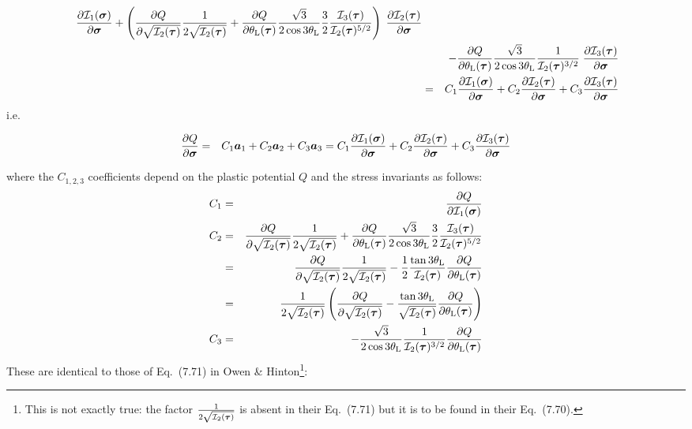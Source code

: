 \begin{eqnarray}
\; \frac{\partial {\cal I}_1(\bm\sigma)}{\partial \bm\sigma} 
+  
\left(\frac{\partial Q}{\partial \sqrt{{\cal I}_2(\bm\tau)}} 
\frac{1}{2 \sqrt{ {\cal I}_2(\bm\tau)}   }   
+
\frac{\partial Q}{\partial \theta_{\rm L}(\bm\tau)} 
\frac{\sqrt{3}}{2\cos 3\theta_{\rm L}}
\frac32  \frac{ {\cal I}_3(\bm\tau)   }{ {\cal I}_2(\bm\tau)^{5/2}}
\right)
\; \frac{\partial {\cal I}_2(\bm\tau)}{\partial \bm\sigma} \nonumber\\
&&
-
\frac{\partial Q}{\partial \theta_{\rm L}(\bm\tau)} 
\frac{\sqrt{3}}{2\cos 3\theta_{\rm L}}
\frac{1}{{\cal I}_2(\bm\tau)^{3/2}} 
\; \frac{\partial {\cal I}_3(\bm\tau)}{\partial \bm\sigma} \nonumber\\
&=& 
C_1  \frac{\partial {\cal I}_1(\bm\sigma)}{\partial \bm\sigma} 
+
C_2  \frac{\partial {\cal I}_2(\bm\tau)}{\partial \bm\sigma} 
+
C_3  \frac{\partial {\cal I}_3(\bm\tau)}{\partial \bm\sigma} 
\end{eqnarray}
i.e.
\begin{mdframed}[backgroundcolor=blue!5]
\begin{eqnarray}
\frac{\partial Q}{\partial \bm\sigma}
&=& 
C_1 {\bm a}_1 +
C_2 {\bm a}_2 +
C_3 {\bm a}_3 
=
C_1  \frac{\partial {\cal I}_1(\bm\sigma)}{\partial \bm\sigma} 
+
C_2  \frac{\partial {\cal I}_2(\bm\tau)}{\partial \bm\sigma} 
+
C_3  \frac{\partial {\cal I}_3(\bm\tau)}{\partial \bm\sigma} 
\end{eqnarray}
\end{mdframed}
where the $C_{1,2,3}$ coefficients depend on the plastic potential $Q$
and the stress invariants as follows:
\begin{eqnarray}
C_1 &=&  \frac{\partial Q}{\partial {\cal I}_1(\bm\sigma)} \\
C_2 
&=& \frac{\partial Q}{\partial \sqrt{{\cal I}_2(\bm\tau)}} 
\frac{1}{2 \sqrt{ {\cal I}_2(\bm\tau)}   }   
+
\frac{\partial Q}{\partial \theta_{\rm L}(\bm\tau)} 
\frac{\sqrt{3}}{2\cos 3\theta_{\rm L}}
\frac32  \frac{ {\cal I}_3(\bm\tau)   }{ {\cal I}_2(\bm\tau)^{5/2}} \nonumber\\
&=& 
\frac{\partial Q}{\partial \sqrt{{\cal I}_2(\bm\tau)}} 
\frac{1}{2 \sqrt{ {\cal I}_2(\bm\tau)}   }   
-
\frac12
\frac{\tan 3\theta_{\rm L}}{ {\cal I}_2(\bm\tau)}
\frac{\partial Q}{\partial \theta_{\rm L}(\bm\tau)}  \nonumber\\
&=& 
\frac{1}{2 \sqrt{ {\cal I}_2(\bm\tau)}   }   
\left(
\frac{\partial Q}{\partial \sqrt{{\cal I}_2(\bm\tau)}} 
-
\frac{\tan 3\theta_{\rm L}}{\sqrt {{\cal I}_2(\bm\tau)}}
\frac{\partial Q}{\partial \theta_{\rm L}(\bm\tau)}  
\right)
\\
C_3 &=&  
-
\frac{\sqrt{3}}{2\cos 3\theta_{\rm L}}
\frac{1}{{\cal I}_2(\bm\tau)^{3/2}} 
\frac{\partial Q}{\partial \theta_{\rm L}(\bm\tau)} 
\end{eqnarray}
These are identical to those of Eq.~(7.71) in Owen \& Hinton\footnote{This is 
not exactly true: the factor  $\frac{1}{2 \sqrt{ {\cal I}_2(\bm\tau)} }$
is absent in their Eq.~(7.71) but it is to be found in their Eq.~(7.70).}:
\begin{center}
\end{center}

